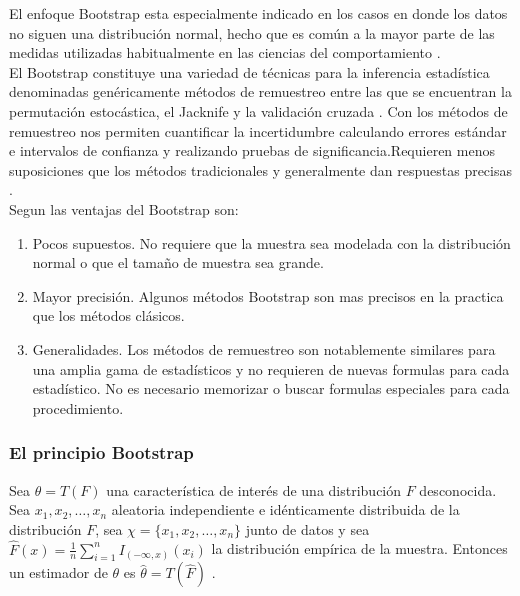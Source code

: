 El enfoque Bootstrap esta especialmente indicado en los casos en donde los datos no siguen una distribución normal, hecho que es común a la mayor parte de las medidas utilizadas habitualmente en las ciencias del comportamiento \parencite{micceri-1989}.\\


El Bootstrap constituye una variedad de técnicas para la inferencia estadística denominadas genéricamente métodos de remuestreo entre las que se encuentran la permutación estocástica, el Jacknife y la validación cruzada \parencite{balam-2012}. Con los métodos de remuestreo nos permiten cuantificar la incertidumbre calculando errores estándar e intervalos de confianza y realizando pruebas de significancia.Requieren menos suposiciones que los métodos tradicionales y generalmente dan respuestas precisas \parencite{hesterberg-2003} .\\


Segun \textcite{hesterberg-2003} las ventajas del Bootstrap son:

\begin{enumerate}
	\item  Pocos supuestos. No requiere que la muestra sea modelada con la distribución normal o que el tamaño de muestra sea grande.
	
	\item Mayor precisión. Algunos métodos Bootstrap son mas precisos en la practica que los métodos clásicos.
	
	\item Generalidades. Los métodos de remuestreo son notablemente similares para una amplia gama de estadísticos y no requieren de nuevas formulas para cada estadístico. No es necesario memorizar o buscar formulas especiales para cada procedimiento.
\end{enumerate}


\subsubsection{El principio Bootstrap}
Sea $\theta =T(F)$ una característica de interés de una distribución $F$ desconocida. Sea $x_{1}, x_{2}, \dots, x_{n}$ aleatoria independiente e idénticamente distribuida de la distribución $F$, sea $\chi =\{ x_{1}, x_{2}, \dots, x_{n} \}$ junto de datos y sea $\hat{F}(x) = \frac{1}{n} \sum_{i=1}^{n} I _{(-\infty, x)} (x_{i})$ la distribución empírica de la muestra. Entonces un estimador de $\theta$ es $\hat{\theta} = T(\hat{F})$ \parencite{givens-2013} .\\

